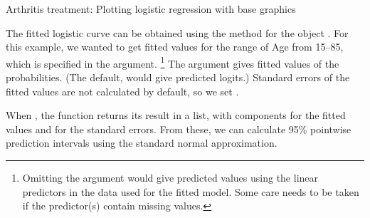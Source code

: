 \documentclass[11pt]{book}
\renewenvironment{knitrout}{\small\renewcommand{\baselinestretch}{.85}}{} %
\begin{document}
\begin{Example}[arthrit7]{Arthritis treatment: Plotting logistic regression with base graphics}
\begin{knitrout}
\color{fgcolor}\begin{kframe}
\begin{alltt}
\hlstd{(} \hlstd{)} \hlopt{~}  
   \hlstd{=} \hlstd{(}\hlstd{,}\hlstd{),}      \hlstd{=}\hlstd{,}
        \hlstd{=}
        \hlstd{)}
\end{alltt}
\end{kframe}
\end{knitrout}
The fitted logistic curve can be obtained using the  method for the
 object .  For this example, we wanted to
get fitted values for the range of Age from 15--85, which is specified
in the  argument.%
\footnote{
Omitting the  argument would give predicted values using the 
linear predictors in the data used for the fitted model.
Some care needs to be taken if the predictor(s) contain missing values.
}
The argument 
gives fitted values of the probabilities. (The default,  would
give predicted logits.)  Standard errors of the fitted values are not calculated
by default, so we set .
\begin{knitrout}
\color{fgcolor}\begin{kframe}
\begin{alltt}
 \hlkwb{<-} \hlstd{(}\hlstd{,} \hlstd{,} \hlstd{)}
 \hlkwb{<-} 
                         \hlstd{=}\hlstd{(}
                         \hlstd{=}\hlstd{,} \hlstd{=}\hlstd{)}
\end{alltt}
\end{kframe}
\end{knitrout}
When ,
the  function returns its result in a list, with components 
for the fitted values and  for the standard errors.
From these, we can calculate 95\% pointwise prediction intervals
using the standard normal approximation.
\begin{knitrout}
\color{fgcolor}\begin{kframe}

\end{kframe}
\end{knitrout}
\end{Example}
\end{document}
